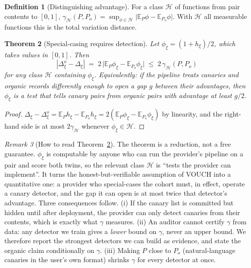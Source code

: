 \documentclass[11pt]{article}
\newtheorem{theorem}{Theorem}
\theoremstyle{definition}
\newtheorem{definition}[theorem]{Definition}
\theoremstyle{remark}
\newtheorem{remark}[theorem]{Remark}
\newcommand{\E}{\mathbb{E}}
\begin{document}
\begin{definition}[Distinguishing advantage]
For a class $\mathcal H$ of functions from pair contents to $[0,1]$,
$\gamma_{\mathcal H}(P,P_o)=\sup_{\phi\in\mathcal H}\bigl|\E_P\phi-\E_{P_o}\phi\bigr|$.
With $\mathcal H$ all measurable functions this is the total variation distance.
\end{definition}

\begin{theorem}[Special-casing requires detection]\label{thm:detect}
Let $\phi_\xi = (1+h_\xi)/2$, which takes values in $[0,1]$. Then
\[
|\Delta^o_\xi - \Delta_\xi| \;=\; 2\,\bigl|\E_{P}\phi_\xi - \E_{P_o}\phi_\xi\bigr|
\;\le\; 2\,\gamma_{\mathcal H}(P,P_o)
\]
for any class $\mathcal H$ containing $\phi_\xi$. Equivalently: if the pipeline treats
canaries and organic records differently enough to open a gap $g$ between their
advantages, then $\phi_\xi$ is a test that tells canary pairs from organic pairs with
advantage at least $g/2$.
\end{theorem}

\begin{proof}
$\Delta_\xi-\Delta^o_\xi = \E_P h_\xi - \E_{P_o}h_\xi = 2(\E_P\phi_\xi-\E_{P_o}\phi_\xi)$
by linearity, and the right-hand side is at most $2\gamma_{\mathcal H}$ whenever
$\phi_\xi\in\mathcal H$.
\end{proof}

\begin{remark}[How to read Theorem~\ref{thm:detect}]
The theorem is a reduction, not a free guarantee. $\phi_\xi$ is computable by anyone
who can run the provider's pipeline on a pair and score both twins, so the relevant
class $\mathcal H$ is ``tests the provider can implement''. It turns the
honest-but-verifiable assumption of VOUCH into a quantitative one: a provider who
special-cases the cohort must, in effect, operate a canary detector, and the gap it
can open is at most twice that detector's advantage. Three consequences follow.
(i) If the canary list is committed but hidden until after deployment, the provider
can only detect canaries from their contents, which is exactly what $\gamma$
measures. (ii) An auditor cannot certify $\gamma$ from data: any detector we train
gives a \emph{lower} bound on $\gamma$, never an upper bound. We therefore report
the strongest detectors we can build as evidence, and state the organic claim
conditionally on $\gamma$. (iii) Making $P$ close to $P_o$ (natural-language
canaries in the user's own format) shrinks $\gamma$ for every detector at once.
\end{remark}
\end{document}
